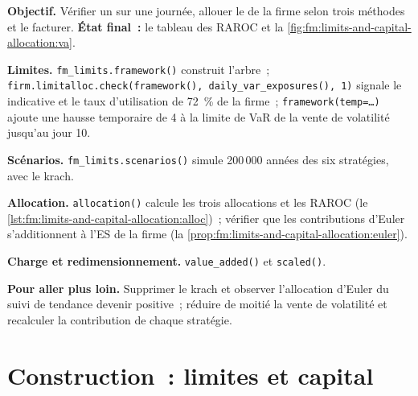 \begin{tutorial}
\textbf{Objectif.} Vérifier un  sur une journée, allouer le  de la firme selon trois méthodes et le facturer. \textbf{État final~:} le tableau
des RAROC et la \cref{fig:fm:limits-and-capital-allocation:va}.
\begin{tutsteps}
\item \textbf{Limites.} \texttt{fm\_limits.framework()} construit l'arbre~; \texttt{firm.limitalloc.check(framework(), daily\_var\_exposures(), 1)}
signale le  indicative et le taux d'utilisation de 72~\% de la firme~; \texttt{framework(temp=\dots)} ajoute une hausse temporaire de 4 à la limite de VaR de la
vente de volatilité jusqu'au jour 10.
\item \textbf{Scénarios.} \texttt{fm\_limits.scenarios()} simule 200\,000 années des six stratégies, avec le krach.
\item \textbf{Allocation.} \texttt{allocation()} calcule les trois allocations et les RAROC (le \cref{lst:fm:limits-and-capital-allocation:alloc})~;
vérifier que les contributions d'Euler s'additionnent à l'ES de la firme (la \cref{prop:fm:limits-and-capital-allocation:euler}).
\item \textbf{Charge et redimensionnement.} \texttt{value\_added()} et \texttt{scaled()}.
\end{tutsteps}
\end{tutorial}

\textbf{Pour aller plus loin.} Supprimer le krach et observer l'allocation d'Euler du suivi de tendance devenir positive~; réduire de moitié la vente de volatilité et recalculer la
contribution de chaque stratégie.

\section{Construction~: limites et capital}\label{bld:fm:limits-and-capital-allocation:limitalloc}

